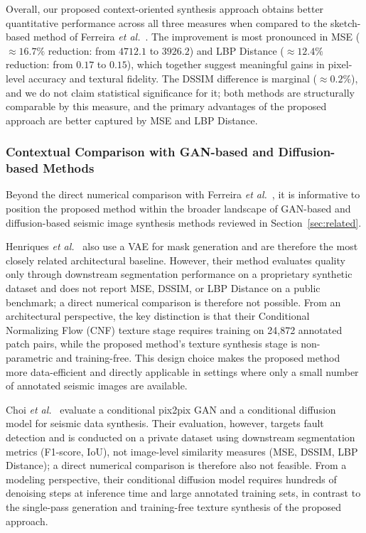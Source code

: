 \documentclass{ieeeaccess}
\begin{document}
Overall, our proposed context-oriented synthesis approach obtains better quantitative performance across all three measures when compared to the sketch-based method of Ferreira \emph{et al.}~\cite{Ferreira2020}. The improvement is most pronounced in MSE ($\approx 16.7\%$ reduction: from $4712.1$ to $3926.2$) and LBP Distance ($\approx 12.4\%$ reduction: from $0.17$ to $0.15$), which together suggest meaningful gains in pixel-level accuracy and textural fidelity. The DSSIM difference is marginal ($\approx 0.2\%$), and we do not claim statistical significance for it; both methods are structurally comparable by this measure, and the primary advantages of the proposed approach are better captured by MSE and LBP Distance.

\subsubsection{Contextual Comparison with GAN-based and Diffusion-based Methods}

Beyond the direct numerical comparison with Ferreira \emph{et al.}~\cite{Ferreira2020}, it is informative to position the proposed method within the broader landscape of GAN-based and diffusion-based seismic image synthesis methods reviewed in Section~\ref{sec:related}.

Henriques \emph{et al.}~\cite{Henriques2021} also use a VAE for mask generation and are therefore the most closely related architectural baseline. However, their method evaluates quality only through downstream segmentation performance on a proprietary synthetic dataset and does not report MSE, DSSIM, or LBP Distance on a public benchmark; a direct numerical comparison is therefore not possible. From an architectural perspective, the key distinction is that their Conditional Normalizing Flow (CNF) texture stage requires training on 24,872 annotated patch pairs, while the proposed method's texture synthesis stage is non-parametric and training-free. This design choice makes the proposed method more data-efficient and directly applicable in settings where only a small number of annotated seismic images are available.

Choi \emph{et al.}~\cite{Choi2025} evaluate a conditional pix2pix GAN and a conditional diffusion model for seismic data synthesis. Their evaluation, however, targets fault detection and is conducted on a private dataset using downstream segmentation metrics (F1-score, IoU), not image-level similarity measures (MSE, DSSIM, LBP Distance); a direct numerical comparison is therefore also not feasible. From a modeling perspective, their conditional diffusion model requires hundreds of denoising steps at inference time and large annotated training sets, in contrast to the single-pass generation and training-free texture synthesis of the proposed approach.
\end{document}
